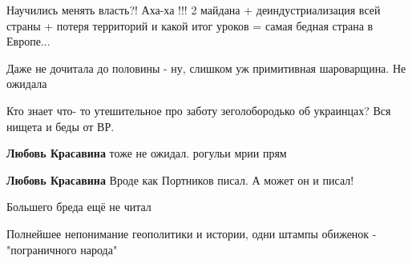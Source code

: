 \begin{itemize}
Научились менять власть?! Аха-ха !!! 2 майдана + деиндустриализация всей страны + потеря территорий и какой итог уроков = самая бедная страна в Европе...

 
Даже не дочитала до половины - ну, слишком уж примитивная шароварщина. Не ожидала

Кто знает что- то утешительное про заботу зеголобородько об украинцах? Вся
нищета и беды от ВР.

\begin{itemize}
 
\textbf{Любовь Красавина} тоже не ожидал. рогульи мрии прям

 
\textbf{Любовь Красавина} Вроде как Портников писал.
А может он и писал!
\end{itemize}

 
Большего бреда ещё не читал

 
Полнейшее непонимание геополитики и истории, одни штампы обиженок - "пограничного народа"

\begin{itemize}
 

\end{itemize}
\end{itemize}

